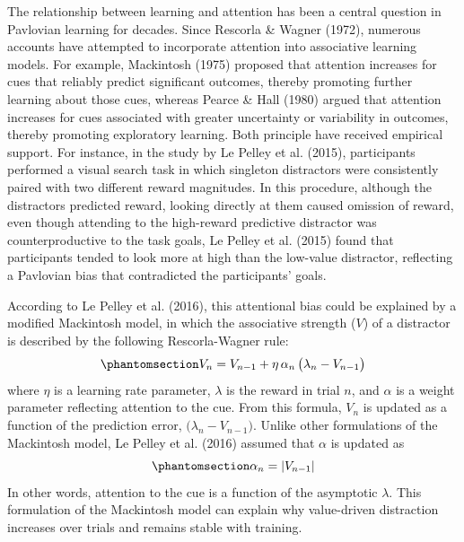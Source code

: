 \documentclass[11pt]{article}
\begin{document}
The relationship between learning and attention has been a central
question in Pavlovian learning for decades. Since Rescorla \& Wagner
(1972), numerous accounts have attempted to incorporate attention into
associative learning models. For example, Mackintosh (1975) proposed
that attention increases for cues that reliably predict significant
outcomes, thereby promoting further learning about those cues, whereas
Pearce \& Hall (1980) argued that attention increases for cues
associated with greater uncertainty or variability in outcomes, thereby
promoting exploratory learning. Both principle have received empirical
support. For instance, in the study by Le Pelley et al. (2015),
participants performed a visual search task in which singleton
distractors were consistently paired with two different reward
magnitudes. In this procedure, although the distractors predicted
reward, looking directly at them caused omission of reward, even though
attending to the high-reward predictive distractor was counterproductive
to the task goals, Le Pelley et al. (2015) found that participants
tended to look more at high than the low-value distractor, reflecting a
Pavlovian bias that contradicted the participants' goals.

According to Le Pelley et al. (2016), this attentional bias could be
explained by a modified Mackintosh model, in which the associative
strength (\(V\)) of a distractor is described by the following
Rescorla-Wagner rule: \begin{equation}\phantomsection\label{eq-1}{ 
V_{n} = V_{n-1} + \eta\,\alpha_{n}\,\bigl(\lambda_{n} - V_{n-1}\bigr)
}\end{equation} where \(\eta\) is a learning rate parameter, \(\lambda\)
is the reward in trial \(n\), and \(\alpha\) is a weight parameter
reflecting attention to the cue. From this formula, \(V_{n}\) is updated
as a function of the prediction error,
\(\bigl(\lambda_{n} - V_{n-1}\bigr)\). Unlike other formulations of the
Mackintosh model, Le Pelley et al. (2016) assumed that \(\alpha\) is
updated as \begin{equation}\phantomsection\label{eq-2}{
\alpha_{n} = \lvert V_{n-1}\rvert
}\end{equation} In other words, attention to the cue is a function of
the asymptotic \(\lambda\). This formulation of the Mackintosh model can
explain why value-driven distraction increases over trials and remains
stable with training.
\end{document}
